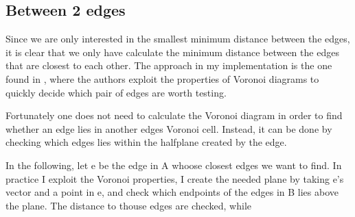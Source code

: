\subsection{Between 2 edges}
Since we are only interested in the smallest minimum distance between the edges, it is clear that we only have calculate the minimum distance between the edges that are closest to each other. The approach in my implementation is the one found in \cite{Larsen99fastproximity}, where the authors exploit the properties of Voronoi diagrams  to quickly decide which pair of edges are worth testing. 

Fortunately one does not need to calculate the Voronoi diagram in order to find whether an edge lies in another edges Voronoi cell. Instead, it can be done by checking which edges lies within the halfplane created by the edge.

In the following, let e be the edge in A whoose closest edges we want to find.  
In practice I exploit the Voronoi properties, I create the needed plane by taking e's vector and a point in e, and check which endpoints of the edges in B lies above the plane. The distance to thouse edges are checked, while 
